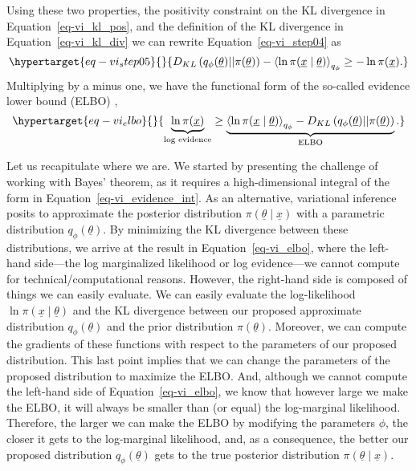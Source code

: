 \documentclass[
]{scrartcl}
\begin{document}
\begin{refsegment}
Using these two properties, the positivity constraint on the KL
divergence in Equation~\ref{eq-vi_kl_pos}, and the definition of the KL
divergence in Equation~\ref{eq-vi_kl_div} we can rewrite
Equation~\ref{eq-vi_step04} as
\begin{equation}\protect\hypertarget{eq-vi_step05}{}{
D_{KL}\left( 
    q_\phi(\underline{\theta}) \vert \vert
    \pi(\underline{\theta}) 
\right) -
\left\langle
    \ln \pi(\underline{x} \mid \underline{\theta})
\right\rangle_{q_\phi}
\geq - \ln \pi(\underline{x}).
}\label{eq-vi_step05}\end{equation} Multiplying by a minus one, we have
the functional form of the so-called evidence lower bound (ELBO)
\textcite{kingma2014},
\begin{equation}\protect\hypertarget{eq-vi_elbo}{}{
\underbrace{
    \ln \pi(\underline{x})
}_{\text{log evidence}} \geq
\underbrace{
    \left\langle
        \ln \pi(\underline{x} \mid \underline{\theta})
    \right\rangle_{q_\phi} -
    D_{KL}\left( 
        q_\phi(\underline{\theta}) \vert \vert
        \pi(\underline{\theta}) 
    \right)
}_{\text{ELBO}}.
}\label{eq-vi_elbo}\end{equation}

Let us recapitulate where we are. We started by presenting the challenge
of working with Bayes' theorem, as it requires a high-dimensional
integral of the form in Equation~\ref{eq-vi_evidence_int}. As an
alternative, variational inference posits to approximate the posterior
distribution \(\pi(\underline{\theta} \mid \underline{x})\) with a
parametric distribution \(q_\phi(\underline{\theta})\). By minimizing
the KL divergence between these distributions, we arrive at the result
in Equation~\ref{eq-vi_elbo}, where the left-hand side---the log
marginalized likelihood or log evidence---we cannot compute for
technical/computational reasons. However, the right-hand side is
composed of things we can easily evaluate. We can easily evaluate the
log-likelihood \(\ln \pi(\underline{x} \mid \underline{\theta})\) and
the KL divergence between our proposed approximate distribution
\(q_\phi(\underline{\theta})\) and the prior distribution
\(\pi(\underline{\theta})\). Moreover, we can compute the gradients of
these functions with respect to the parameters of our proposed
distribution. This last point implies that we can change the parameters
of the proposed distribution to maximize the ELBO. And, although we
cannot compute the left-hand side of Equation~\ref{eq-vi_elbo}, we know
that however large we make the ELBO, it will always be smaller than (or
equal) the log-marginal likelihood. Therefore, the larger we can make
the ELBO by modifying the parameters \(\phi\), the closer it gets to the
log-marginal likelihood, and, as a consequence, the better our proposed
distribution \(q_\phi(\underline{\theta})\) gets to the true posterior
distribution \(\pi(\underline{\theta} \mid \underline{x})\).


\end{refsegment}
\end{document}
